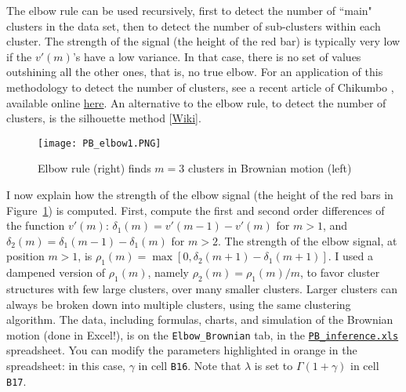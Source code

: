 \documentclass[10pt]{article}
\begin{document}
The elbow rule can be used recursively, first to detect the number of ``main" clusters in the data set, then to detect the number of sub-clusters within each cluster. The strength of the signal (the height of the red bar) is typically very low if the $v'(m)$'s have a low variance. In that case, there is no set of values outshining all the other ones, that is, no true elbow. For an application of this methodology to detect the number of clusters, see a recent article of Chikumbo \cite{vg5}, available online
\href{https://www.mdpi.com/2504-4990/1/2/42}{here}. An alternative to the elbow rule, to detect the number of clusters,
is the silhouette method [\href{https://en.wikipedia.org/wiki/Silhouette_(clustering)}{Wiki}].

\begin{figure}[H]
\centering
\texttt{[image: PB\_elbow1.PNG]}
\caption{Elbow rule (right) finds $m = 3$ clusters in Brownian motion (left)}
\label{fig:pbelbow1}
\end{figure}

I now explain how the strength of the elbow signal (the height of the red bars in Figure~\ref{fig:pbelbow1}) is computed. First, compute the first and second order differences of the function $v'(m)$:
$\delta_1(m)=v'(m-1)-v'(m)$ for $m>1$, and $\delta_2(m)=\delta_1(m-1)-\delta_1(m)$ for $m>2$. The strength of the elbow signal, at position $m>1$,
is  $\rho_1(m)=\max[0,\delta_2(m+1)-\delta_1(m+1)]$. I used a dampened version of $\rho_1(m)$, namely $\rho_2(m)=\rho_1(m)/m$, to favor cluster
structures with few large clusters, over many smaller clusters. Larger clusters can always be broken down into multiple clusters, using the same clustering algorithm.
The data, including formulas, charts, and simulation of the Brownian motion (done in Excel!), is on the \texttt{Elbow\_Brownian} tab,
in the \href{https://github.com/VincentGranville/Point-Processes/tree/main/Spreadsheets}{\texttt{PB\_inference.xls}} spreadsheet. You can modify the parameters highlighted in orange in the spreadsheet: in this case, $\gamma$ in cell
\texttt{B16}. Note that
$\lambda$ is set to $\Gamma(1+\gamma)$ in cell \texttt{B17}. \\

\end{document}
